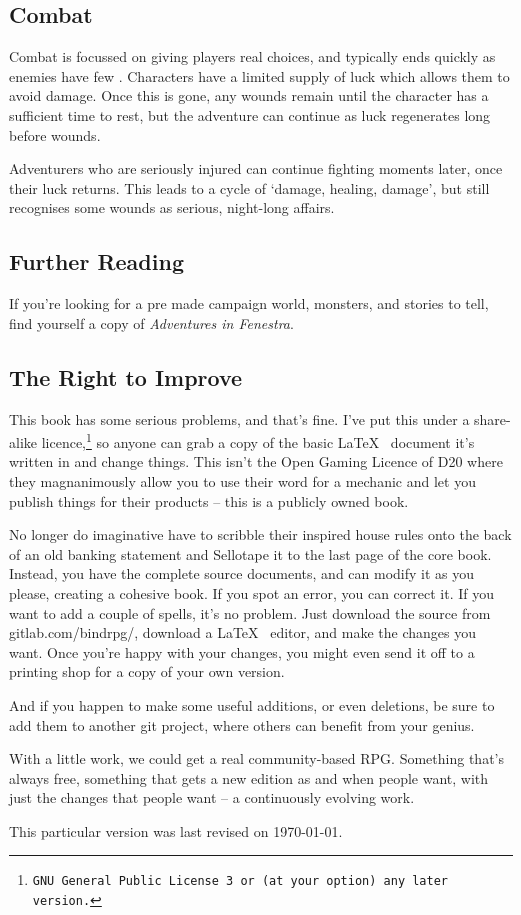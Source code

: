 \begin{multicols}{2}
\subsection*{Combat}

Combat is focussed on giving players real choices, and typically ends quickly as enemies have few .
Characters have a limited supply of luck which allows them to avoid damage.
Once this is gone, any wounds remain until the character has a sufficient time to rest, but the adventure can continue as luck regenerates long before wounds.

Adventurers who are seriously injured can continue fighting moments later, once their luck returns.
This leads to a cycle of `damage, healing, damage', but still recognises some wounds as serious, night-long affairs.

\subsection*{Further Reading}

If you're looking for a pre made campaign world, monsters, and stories to tell, find yourself a copy of \textit{Adventures in Fenestra}.

\subsection*{The Right to Improve}

\noindent
This book has some serious problems, and that's fine.  I've put this under a share-alike licence,\footnote{\tt GNU General Public License 3 or (at your option) any later version.} so anyone can grab a copy of the basic \LaTeX~ document it's written in and change things.  This isn't the Open Gaming Licence of D20 where they magnanimously allow you to use their word for a mechanic and let you publish things for their products -- this is a publicly owned book.

No longer do imaginative  have to scribble their inspired house rules onto the back of an old banking statement and Sellotape it to the last page of the core book.
Instead, you have the complete source documents, and can modify it as you please, creating a cohesive book.
If you spot an error, you can correct it.
If you want to add a couple of spells, it's no problem.
Just download the source from gitlab.com/bindrpg/, download a \LaTeX~ editor, and make the changes you want.
Once you're happy with your changes, you might even send it off to a printing shop for a copy of your own version.

And if you happen to make some useful additions, or even deletions, be sure to add them to another git project, where others can benefit from your genius.

With a little work, we could get a real community-based RPG.
Something that's always free, something that gets a new edition as and when people want, with just the changes that people want -- a continuously evolving work.

This particular version was last revised on \today.

\end{multicols}

